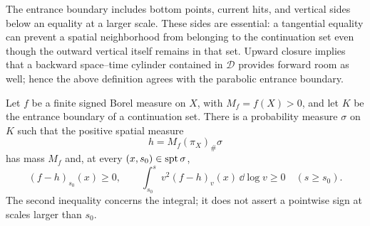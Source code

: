 The entrance boundary includes bottom points, current hits, and vertical
sides below an equality at a larger scale.  These sides are essential:
a tangential equality can prevent a spatial neighborhood from belonging
to the continuation set even though the outward vertical itself remains
in that set.  Upward closure implies that a backward space--time cylinder
contained in $\mathcal D$ provides forward room as well; hence the above
definition agrees with the parabolic entrance boundary.

\begin{lemma}\label{ct:contact}
Let $f$ be a finite signed Borel measure on $X$, with $M_f=f(X)>0$, and
let $K$ be the entrance boundary of a continuation set.  There is a
probability measure $\sigma$ on $K$ such that the positive spatial measure
\[
 h=M_f(\pi_X)_\#\sigma
\]
has mass $M_f$ and, at every $(x,s_0)\in\operatorname{spt}\sigma$,
\begin{equation}\label{ct:contact-signs}
 (f-h)_{s_0}(x)\ge0,
 \qquad
 \int_{s_0}^{s}v^2(f-h)_v(x)\,\dd\log v\ge0
 \quad(s\ge s_0).
\end{equation}
The second inequality concerns the integral; it does not assert a
pointwise sign at scales larger than $s_0$.
\end{lemma}

